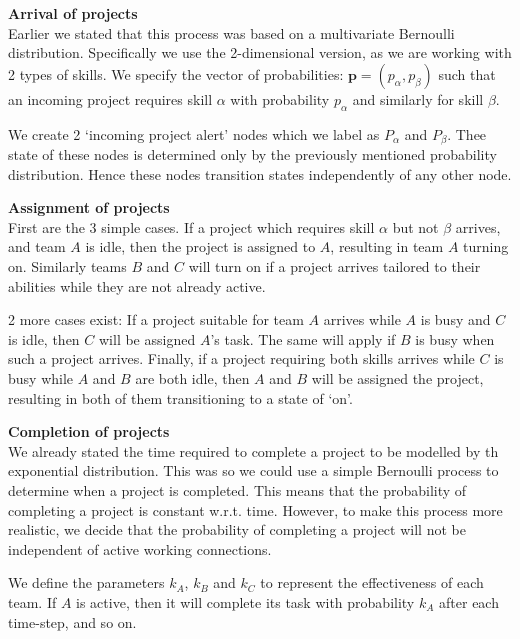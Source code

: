 \begin{steps}
	
	\item \textbf{Arrival of projects}\\
	Earlier we stated that this process was based on a multivariate Bernoulli distribution. Specifically we use the 2-dimensional version, as we are working with 2 types of skills. We specify the vector of probabilities: $\mathbf{p} = (p_\alpha, p_\beta)$ such that an incoming project requires skill $\alpha$ with probability $p_\alpha$ and similarly for skill $\beta$.
	
	We create 2 `incoming project alert' nodes which we label as $P_\alpha$ and $P_\beta$. Thee state of these nodes is determined only by the previously mentioned probability distribution. Hence these nodes transition states independently of any other node. 
	
	\item \textbf{Assignment of projects}\\
	First are the 3 simple cases. If a project which requires skill $\alpha$ but not $\beta$ arrives, and team $A$ is idle, then the project is assigned to $A$, resulting in team $A$ turning on. Similarly teams $B$ and $C$ will turn on if a project arrives tailored to their abilities while they are not already active.	
	
	2 more cases exist: If a project suitable for team $A$ arrives while $A$ is busy and $C$ is idle, then $C$ will be assigned $A$'s task. The same will apply if $B$ is busy when such a project arrives. Finally, if a project requiring both skills arrives while $C$ is busy while $A$ and $B$ are both idle, then $A$ and $B$ will be assigned the project, resulting in both of them transitioning to a state of `on'.
	
	\item \textbf{Completion of projects}\\
	We already stated the time required to complete a project to be modelled by th exponential distribution. This was so we could use a simple Bernoulli process to determine when a project is completed. This means that the probability of completing a project is constant w.r.t. time. However, to make this process more realistic, we decide that the probability of completing a project will not be independent of active working connections.
	
	We define the parameters $k_A$, $k_B$ and $k_C$ to represent the effectiveness of each team. If $A$ is active, then it will complete its task with probability $k_A$ after each time-step, and so on. 
	

\end{steps}
